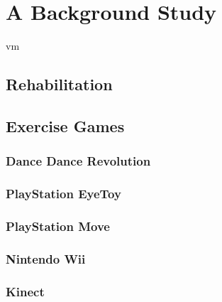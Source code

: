 \chapter{A Background Study}
\ac{vm}
\section{Rehabilitation}
\section{Exercise Games}
\subsection{Dance Dance Revolution}
\subsection{PlayStation EyeToy}
\subsection{PlayStation Move}
\subsection{Nintendo Wii}
\subsection{Kinect}